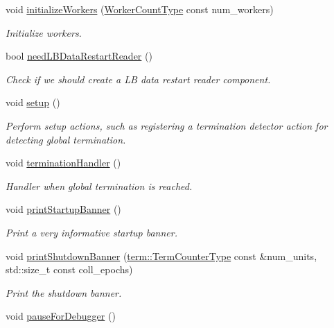 \begin{DoxyCompactItemize}
void \hyperlink{structvt_1_1runtime_1_1_runtime_a264ccc1306fc3b5dfc20830fa313cba0}{initialize\+Workers} (\hyperlink{namespacevt_aa93398ea48f2cb6c188512250f7cc248}{Worker\+Count\+Type} const num\+\_\+workers)
\begin{DoxyCompactList}\small\item\em Initialize workers. \end{DoxyCompactList}\item 
bool \hyperlink{structvt_1_1runtime_1_1_runtime_a494534b0e9e9fcbb10262442d7e427c9}{need\+L\+B\+Data\+Restart\+Reader} ()
\begin{DoxyCompactList}\small\item\em Check if we should create a LB data restart reader component. \end{DoxyCompactList}\item 
void \hyperlink{structvt_1_1runtime_1_1_runtime_a1c4fda11afb43bb2607cd1f00686550c}{setup} ()
\begin{DoxyCompactList}\small\item\em Perform setup actions, such as registering a termination detector action for detecting global termination. \end{DoxyCompactList}\item 
void \hyperlink{structvt_1_1runtime_1_1_runtime_a2d12f2a97d99585ef8e89cda0ed48972}{termination\+Handler} ()
\begin{DoxyCompactList}\small\item\em Handler when global termination is reached. \end{DoxyCompactList}\item 
void \hyperlink{structvt_1_1runtime_1_1_runtime_add9fabaf1c2f47ebf9c662f4b5f5931f}{print\+Startup\+Banner} ()
\begin{DoxyCompactList}\small\item\em Print a very informative startup banner. \end{DoxyCompactList}\item 
void \hyperlink{structvt_1_1runtime_1_1_runtime_a04efbdc6b8826e2c885987279a4762f1}{print\+Shutdown\+Banner} (\hyperlink{namespacevt_1_1term_a4fd378cdb0c36683afc1b3399d685f7f}{term\+::\+Term\+Counter\+Type} const \&num\+\_\+units, std\+::size\+\_\+t const coll\+\_\+epochs)
\begin{DoxyCompactList}\small\item\em Print the shutdown banner. \end{DoxyCompactList}\item 
void \hyperlink{structvt_1_1runtime_1_1_runtime_afb151608d12de9a50ce037d5e8896e99}{pause\+For\+Debugger} ()

\end{DoxyCompactItemize}
